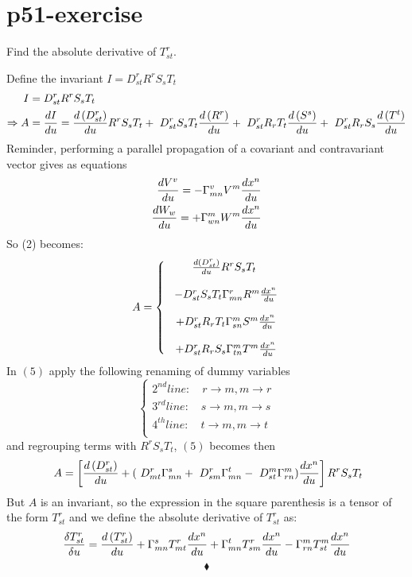 \section{p51-exercise}
\begin{tcolorbox}
Find the absolute derivative of $T^r_{st}$.
\end{tcolorbox}
Define the invariant $ I = D^r_{st}R^rS_sT_t$ 
\begin{align}
\ I &= D^r_{st}R^rS_sT_t\\
\Rightarrow A &= \dv{I}{u}= 
\dv{\left(D^r_{st}\right)}{u}R^rS_sT_t+
\ D^r_{st}S_sT_t\dv{\left(R^r\right)}{u}+
\ D^r_{st}R_rT_t\dv{\left(S^s\right)}{u}+
\ D^r_{st}R_rS_s\dv{\left(T^t\right)}{u}
\end{align} 
Reminder, performing a parallel propagation of a covariant and contravariant vector gives as equations
\begin{align}
\dv{V^v}{u} = - \Gamma^v_{mn}V^m\dv{x^n}{u}\\
\dv{W_w}{u} = + \Gamma^m_{wn}W^m\dv{x^n}{u}
\end{align}
So (2) becomes:
\begin{align}
\ A = \left\{ \begin{array}{c}
\dv{\left(D^r_{st}\right)}{u}R^rS_sT_t\\\\
\ -D^r_{st}S_sT_t\Gamma^r_{mn}R^m\dv{x^n}{u}\\\\
\ +D^r_{st}R_rT_t \Gamma^m_{sn}S^m\dv{x^n}{u}\\\\
\ +D^r_{st}R_rS_s\Gamma^m_{tn}T^m\dv{x^n}{u}
\end{array} \right.
\end{align}
In $(5)$ apply the following renaming of dummy variables 
$$\left\{\begin{array}{c}
2^{nd} line: \quad r\rightarrow m, m \rightarrow r\\
3^{rd} line: \quad s\rightarrow m, m \rightarrow s\\
4^{th} line: \quad t\rightarrow m, m \rightarrow t\\
\end{array}  \right. $$
and regrouping terms with $R^rS_sT_t$, $(5)$  becomes then
\begin{align*}
\ A = \left[\dv{\left(D^r_{st}\right)}{u}+(\ D^r_{mt}\Gamma^s_{mn}+\ D^r_{sm}\Gamma^t_{mn}-\ D^m_{st}\Gamma^m_{rn})\dv{x^n}{u}\right]R^rS_sT_t
\end{align*}
But $A$ is an invariant, so the expression in the square parenthesis is a tensor of the form $T^r_{st}$ and we define the absolute derivative of $T^r_{st}$ as:
$$ \frac{\delta T^r_{st}}{\delta u} = \dv{\left(T^r_{st}\right)}{u}+\Gamma^s_{mn} T^r_{mt}\dv{x^n}{u}+\Gamma^t_{mn}T^r_{sm}\dv{x^n}{u}-\Gamma^m_{rn} T^m_{st}\dv{x^n}{u}$$
$$\blacklozenge$$
\newpage

